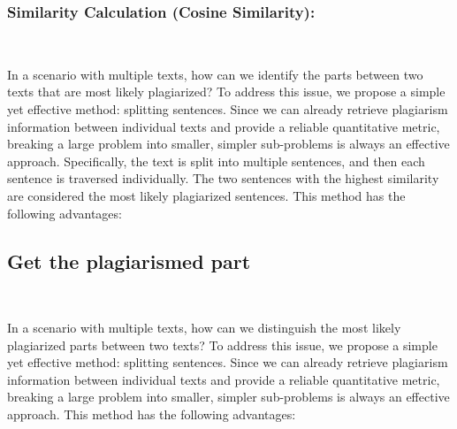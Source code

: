 \subsubsection{Similarity Calculation (Cosine Similarity):}
\

In a scenario with multiple texts, how can we identify the parts between two texts that are most likely plagiarized? To address this issue, we propose a simple yet effective method: splitting sentences. Since we can already retrieve plagiarism information between individual texts and provide a reliable quantitative metric, breaking a large problem into smaller, simpler sub-problems is always an effective approach. Specifically, the text is split into multiple sentences, and then each sentence is traversed individually. The two sentences with the highest similarity are considered the most likely plagiarized sentences. This method has the following advantages:

\subsection{Get the plagiarismed part}
\

In a scenario with multiple texts, how can we distinguish the most likely plagiarized parts between two texts? To address this issue, we propose a simple yet effective method: splitting sentences. Since we can already retrieve plagiarism information between individual texts and provide a reliable quantitative metric, breaking a large problem into smaller, simpler sub-problems is always an effective approach. This method has the following advantages:

